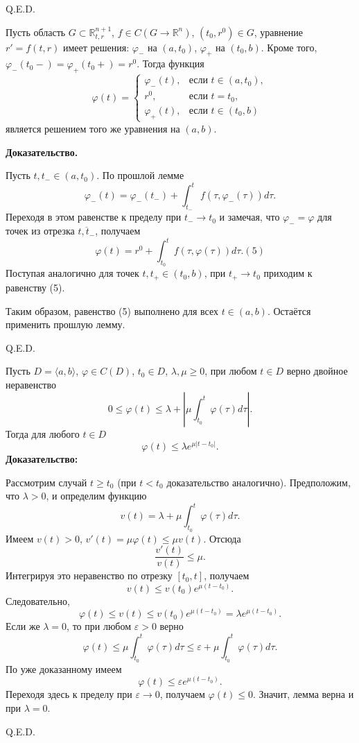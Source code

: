 \hfill Q.E.D.



Пусть область $G \subset \mathbb{R}_{t,r}^{n+1}$, $f \in C(G \rightarrow \mathbb{R}^n)$, $(t_0, r^0) \in G$, уравнение $r' = f(t, r)$ имеет решения: $\varphi_-$ на $(a, t_0)$, $\varphi_+$ на $(t_0, b)$. Кроме того, $\varphi_-(t_0 -) = \varphi_+(t_0 +) = r^0$. Тогда функция
$$\varphi(t) =
\begin{cases}
\varphi_-(t), & \text{если } t \in (a, t_0), \\
r^0, & \text{если } t = t_0, \\
\varphi_+(t), & \text{если } t \in (t_0, b)
\end{cases}$$
является решением того же уравнения на $(a, b)$.

\textbf{Доказательство.}

Пусть $t, t_- \in (a, t_0)$. По прошлой лемме 
$$\varphi_-(t) = \varphi_-(t_-) + \int_{t_-}^t f(\tau, \varphi_-(\tau)) d\tau.$$
Переходя в этом равенстве к пределу при $t_- \rightarrow t_0$ и замечая, что $\varphi_- = \varphi$ для точек из отрезка $\overline{t, t_{-}}$, получаем
$$\varphi(t) = r^0 + \int_{t_0}^t f(\tau, \varphi(\tau)) d\tau. (5)$$
Поступая аналогично для точек $t, t_+ \in (t_0, b)$, при $t_+ \rightarrow t_0$ приходим к равенству (5).

Таким образом, равенство (5) выполнено для всех $t \in (a, b)$. Остаётся применить прошлую лемму.

\hfill Q.E.D.


Пусть $D = \langle a, b\rangle$, $\varphi \in C(D)$, $t_0 \in D$, $\lambda, \mu \geq 0$, при любом $t \in D$ верно двойное неравенство
$$0 \leq \varphi(t) \leq \lambda + \left|\mu \int_{t_0}^t \varphi(\tau) d\tau \right|.$$
Тогда для любого $t \in D$
$$\varphi(t) \leq \lambda e^{\mu |t - t_0|}.$$
\textbf{Доказательство:}

Рассмотрим случай $t \geq t_0$ (при $t < t_0$ доказательство аналогично). Предположим, что $\lambda > 0$, и определим функцию
$$v(t) = \lambda + \mu \int_{t_0}^t \varphi(\tau) d\tau.$$
Имеем $v(t) > 0$, $v'(t) = \mu \varphi(t) \leq \mu v(t)$. Отсюда
$$\frac{v'(t)}{v(t)} \leq \mu.$$
Интегрируя это неравенство по отрезку $[t_0, t]$, получаем
$$v(t) \leq v(t_0) e^{\mu(t - t_0)}.$$
Следовательно,
$$\varphi(t) \leq v(t) \leq v(t_0) e^{\mu(t - t_0)} = \lambda e^{\mu(t - t_0)}.$$
Если же $\lambda = 0$, то при любом $\varepsilon > 0$ верно
$$
\varphi(t) \leq \mu \int_{t_0}^t \varphi(\tau) d\tau \leq \varepsilon + \mu \int_{t_0}^t \varphi(\tau) d\tau.
$$
По уже доказанному имеем
$$\varphi(t) \leq \varepsilon e^{\mu (t - t_0)}.$$
Переходя здесь к пределу при $\varepsilon \rightarrow 0$, получаем $\varphi(t) \leq 0$. Значит, лемма верна и при $\lambda = 0$.

\hfill Q.E.D.
